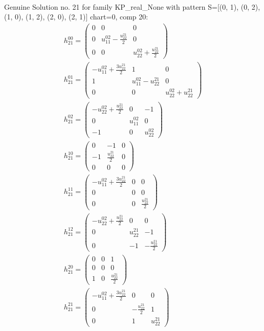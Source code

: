 \documentclass[a4paper, 11pt, twoside, onecolumn]{article}
\begin{document}
\begin{landscape}
\begin{gather*}
\end{gather*} 
Genuine Solution no. 21 for family KP_real_None with pattern S=[(0, 1), (0, 2), (1, 0), (1, 2), (2, 0), (2, 1)] chart=0, comp 20: 
\begin{gather*} 
	 h_{21}^{00}=\begin{pmatrix}0 & 0 & 0\\0 & u^{02}_{11} - \frac{u^{21}_{22}}{2} & 0\\0 & 0 & u^{02}_{22} + \frac{u^{21}_{22}}{2}\end{pmatrix}\\ 
	 h_{21}^{01}=\begin{pmatrix}- u^{02}_{11} + \frac{3 u^{21}_{22}}{2} & 1 & 0\\1 & u^{02}_{11} - u^{21}_{22} & 0\\0 & 0 & u^{02}_{22} + u^{21}_{22}\end{pmatrix}\\ 
	 h_{21}^{02}=\begin{pmatrix}- u^{02}_{22} + \frac{u^{21}_{22}}{2} & 0 & -1\\0 & u^{02}_{11} & 0\\-1 & 0 & u^{02}_{22}\end{pmatrix}\\ 
	 h_{21}^{10}=\begin{pmatrix}0 & -1 & 0\\-1 & \frac{u^{21}_{22}}{2} & 0\\0 & 0 & 0\end{pmatrix}\\ 
	 h_{21}^{11}=\begin{pmatrix}- u^{02}_{11} + \frac{3 u^{21}_{22}}{2} & 0 & 0\\0 & 0 & 0\\0 & 0 & \frac{u^{21}_{22}}{2}\end{pmatrix}\\ 
	 h_{21}^{12}=\begin{pmatrix}- u^{02}_{22} + \frac{u^{21}_{22}}{2} & 0 & 0\\0 & u^{21}_{22} & -1\\0 & -1 & - \frac{u^{21}_{22}}{2}\end{pmatrix}\\ 
	 h_{21}^{20}=\begin{pmatrix}0 & 0 & 1\\0 & 0 & 0\\1 & 0 & \frac{u^{21}_{22}}{2}\end{pmatrix}\\ 
	 h_{21}^{21}=\begin{pmatrix}- u^{02}_{11} + \frac{3 u^{21}_{22}}{2} & 0 & 0\\0 & - \frac{u^{21}_{22}}{2} & 1\\0 & 1 & u^{21}_{22}\end{pmatrix}\\ 

\end{gather*}
\end{landscape}
\end{document}

